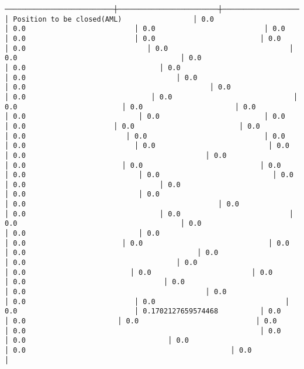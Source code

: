 \documentclass[11pt]{article}
\begin{document}
\begin{Verbatim}[commandchars=\\\{\}]
──────────────────────────┼────────────────────────┼───────────────────────────────────────┼──────────────────────────────────────┼────────────────────────────────────┼────────────────────────────────────────┼────────────────────────────────┼──────────────────────────┼─────────────────────────────┤
│ Position to be closed(AML)                 │ 0.0                                      │ 0.0                          │ 0.0                          │ 0.0                          │ 0.0                          │ 0.0                         │ 0.0                         │ 0.0                             │ 0.0                             │ 0.0                                       │ 0.0                                  │ 0.0                                │ 0.0                                         │ 0.0                                    │ 0.0                                    │ 0.0                                            │ 0.0                             │ 0.0                              │ 0.0                             │ 0.0                         │ 0.0                      │ 0.0                                │ 0.0                           │ 0.0                         │ 0.0                      │ 0.0                     │ 0.0                         │ 0.0                                  │ 0.0                        │ 0.0                            │ 0.0                           │ 0.0                          │ 0.0                           │ 0.0                                            │ 0.0                                           │ 0.0                      │ 0.0                       │ 0.0                            │ 0.0                                │ 0.0                           │ 0.0                           │ 0.0                          │ 0.0                                │ 0.0                            │ 0.0                           │ 0.0                                         │ 0.0                                              │ 0.0                           │ 0.0                                │ 0.0                          │ 0.0                                       │ 0.0                          │ 0.0                           │ 0.0                                     │ 0.0                       │ 0.0                              │ 0.0                                     │ 0.0                                         │ 0.0                                         │ 0.0                                    │ 0.0                                │ 0.0                         │ 0.0                        │ 0.0                              │ 0.0                                 │ 0.0                            │ 0.0                                           │ 0.0                            │ 0.0                          │ 0.0                               │ 0.0                            │ 0.1702127659574468          │ 0.0                     │ 0.0                      │ 0.0                            │ 0.0                                   │ 0.0                                                        │ 0.0                                       │ 0.0                                  │ 0.0                                │ 0.0                                                 │ 0.0                                       │ 
\end{Verbatim}
\end{document}
